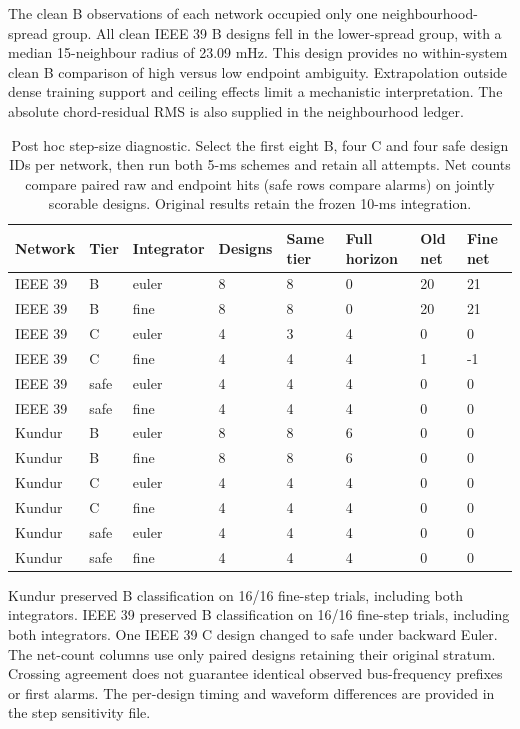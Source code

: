 \documentclass[10pt]{article}
\begin{document}
The clean B observations of each network occupied only one neighbourhood-spread group. All clean IEEE 39 B designs fell in the lower-spread group, with a median 15-neighbour radius of 23.09 mHz. This design provides no within-system clean B comparison of high versus low endpoint ambiguity. Extrapolation outside dense training support and ceiling effects limit a mechanistic interpretation. The absolute chord-residual RMS is also supplied in the neighbourhood ledger.
\begin{table}[htbp]\centering\small
\caption{Post hoc step-size diagnostic. Select the first eight B, four C and four safe design IDs per network, then run both 5-ms schemes and retain all attempts. Net counts compare paired raw and endpoint hits (safe rows compare alarms) on jointly scorable designs. Original results retain the frozen 10-ms integration.}\label{tab:sens}
\begin{tabular}{@{}llllllll@{}}\toprule
Network & Tier & Integrator & Designs & Same tier & Full horizon & Old net & Fine net \\\midrule
IEEE 39 & B & euler & 8 & 8 & 0 & 20 & 21 \\
IEEE 39 & B & fine & 8 & 8 & 0 & 20 & 21 \\
IEEE 39 & C & euler & 4 & 3 & 4 & 0 & 0 \\
IEEE 39 & C & fine & 4 & 4 & 4 & 1 & -1 \\
IEEE 39 & safe & euler & 4 & 4 & 4 & 0 & 0 \\
IEEE 39 & safe & fine & 4 & 4 & 4 & 0 & 0 \\
Kundur & B & euler & 8 & 8 & 6 & 0 & 0 \\
Kundur & B & fine & 8 & 8 & 6 & 0 & 0 \\
Kundur & C & euler & 4 & 4 & 4 & 0 & 0 \\
Kundur & C & fine & 4 & 4 & 4 & 0 & 0 \\
Kundur & safe & euler & 4 & 4 & 4 & 0 & 0 \\
Kundur & safe & fine & 4 & 4 & 4 & 0 & 0 \\
\bottomrule\end{tabular}\end{table}
Kundur preserved B classification on 16/16 fine-step trials, including both integrators. 
IEEE 39 preserved B classification on 16/16 fine-step trials, including both integrators. One IEEE 39 C design changed to safe under backward Euler. The net-count columns use only paired designs retaining their original stratum. Crossing agreement does not guarantee identical observed bus-frequency prefixes or first alarms. The per-design timing and waveform differences are provided in the step sensitivity file.
\end{document}
